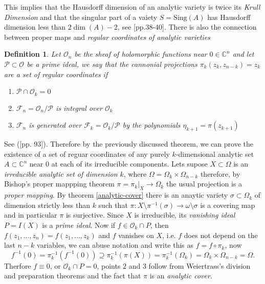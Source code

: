 \documentclass[12pt,twoside,a4paper]{report}
\newtheorem{definition}{Definition}[section]
\newcommand{\con}{\ensuremath{\mathbb{C}^n}}
\newcommand{\om}{\ensuremath{\Omega}}
\newcommand{\osheaf}{\ensuremath{\mathcal O }}
\newcommand{\psheaf}{\ensuremath{\mathcal P }}
\begin{document}
This implies that the Hausdorff dimension of an analytic variety is twice its \emph{Krull Dimension} and that the singular part of a vaiety $S=\mathrm{Sing}(A)$ has Hausdorff dimension less than $2\dim(A)-2$, see \cite{Chirka}[pp.38-40]. There is also the connection between proper maps and \emph{regular coordinates of analytic varieties}

\begin{definition}
Let $\osheaf_{n}$ be the sheaf of holomorphic functions near $0\in\con$ and let $\psheaf\subset\osheaf$ be a prime ideal, we say that the cannonial projections $\pi_{k}(z_{k},z_{n-k})=z_{k}$ are a set of \emph{regular coordinates} if
    \begin{enumerate}
      \item[1] $\mathcal{P}\cap\osheaf_{k}=0$
      \item[2] $\mathcal{F}_{n}=\osheaf_{n}/\mathcal{P}$ is integral over $\mathcal{O}_{k}$
      \item[3] $\mathcal{F}_{n}$ is generated over $\mathcal{F}_{k}=\osheaf_{k}/\mathcal{P}$ by the polynomials $\eta_{k+1}=\pi(z_{k+1})$
    \end{enumerate}
  \end{definition}
  See (\cite{Gunning-Rossi}[pp. 93]). Therefore by the previously discussed theorem, we can prove the existence of a set of reguar coordinates of any purely $k$-dimensional analytic set $A\subset\con$ near $0$ at each of its irreducible components. Lets supose $X\subset\om$ is an \emph{irreducible analytic set of dimension \(k\)}, where $\om=\om_{k}\times\om_{n-k}$ therefore, by Bishop's proper mappping theorem \(\pi=\pi_{k}|_{X}\to\om_{k}\) the usual projection is a \emph{proper mapping}. By theorem \ref{analytic-cover} there  is an anaytic variety $\sigma\subset\om_{k}$ of dimension strictly less than $k$ such that $\pi:X\setminus\pi^{-1}(\sigma)\to\omega\setminus\sigma$ is a covering map and in particular $\pi$ is surjective. Since $X$ is irreducible, its \emph{vanishing ideal} $P=I(X)$ is a \emph{prime ideal}. Now if $f\in\osheaf_{k}\cap P$, then $f(z_{1},\dots,z_{n})=f(z_{1},\dots,z_{k})$ and $f$ vanishes on $X$, i.e. $f$ does not depend on the last $n-k$ variables, we can abuse notation and write this as $f=f\circ\pi_{k}$, now
  \[
    f^{-1}(0)=\pi_{k}^{-1}(f^{-1}(0))\supseteq\pi_{k}^{-1}(\pi(X))=\pi_{k}^{-1}(\om_{k})=\om_{k}\times\om_{n-k}=\om.
  \]
Therfore $f\equiv0$, or $\osheaf_{k}\cap P=0$, points $2$ and $3$ follow from Weiertrass's division and preparation theorems and the fact that $\pi$ is an \emph{analytic cover}.
\end{document}
